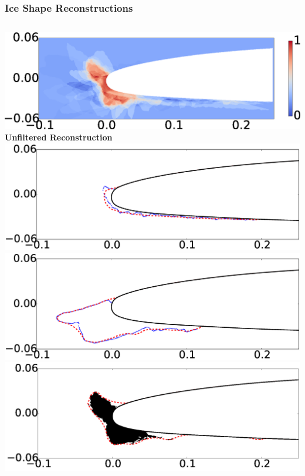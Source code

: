 \documentclass[9pt]{beamer}
\begin{document}
\begin{frame}
\frametitle{Ice Shape Reconstructions}
\label{sec-4-3}


\begin{columns}[c]
    \centering
    \hspace{-0.5em}
    \includegraphics[width=1\textwidth]{UnfilteredReconstruction.png} \\
    {\bf Unfiltered Reconstruction} \\
    \includegraphics[width=1\textwidth]{ReconstructionE1} \\
    \includegraphics[width=1\textwidth]{ReconstructionE9} \\
    \centering
    \includegraphics[width=1\textwidth]{FilteredReconstruction.png} \\

\end{columns}
\end{frame}
\end{document}
